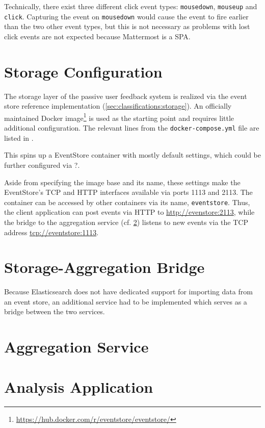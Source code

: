 Technically, there exist three different click event types: \texttt{mousedown}, \texttt{mouseup} and \texttt{click}.
Capturing the event on \texttt{mousedown} would cause the event to fire earlier than the two other event types, but this is not necessary as problems with lost click events are not expected because Mattermost is a \ac{SPA}.

\section{Storage Configuration}
\label{sec:implementation:storage}

The storage layer of the passive user feedback system is realized via the event store reference implementation (\cref{sec:classifications:storage}).
An officially maintained Docker image\footnote{\url{https://hub.docker.com/r/eventstore/eventstore/}} is used as the starting point and requires little additional configuration.
The relevant lines from the \texttt{docker-compose.yml} file are listed in .


This spins up a EventStore container with mostly default settings, which could be further configured via ?.

Aside from specifying the image base and its name, these settings make the EventStore's TCP and HTTP interfaces available via ports 1113 and 2113.
The container can be accessed by other containers via its name, \texttt{eventstore}.
Thus, the client application can post events via HTTP to \url{http://evenstore:2113}, while the bridge to the aggregation service (cf. \cref{sec:implementation:bridge}) listens to new events via the TCP address \url{tcp://eventstore:1113}.

\section{Storage-Aggregation Bridge}
\label{sec:implementation:bridge}

Because Elasticsearch does not have dedicated support for importing data from an event store, an additional service had to be implemented which serves as a bridge between the two services.

\section{Aggregation Service}
\label{sec:implementation:aggregation}

\section{Analysis Application}
\label{sec:implementation:analysis}

